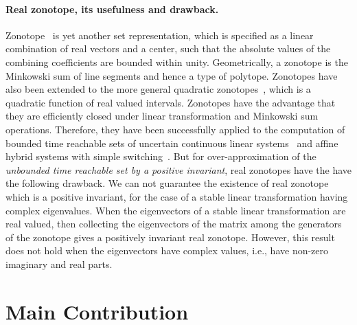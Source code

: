 \documentclass[11pt,a4paper,twoside,openright]{article}
\begin{document}
\paragraph{Real zonotope, its usefulness and drawback.}
Zonotope~\cite{DBLP:conf/hybrid/Girard05} is yet another set
representation, which is specified as a linear combination of real
vectors and a center, such that the absolute values of the combining
coefficients are bounded within unity.  Geometrically, a zonotope is
the Minkowski sum of line segments and hence a type of polytope.
Zonotopes have also been extended to the more general quadratic
zonotopes~\cite{DBLP:conf/aplas/AdjeGW15}, which is a quadratic
function of real valued intervals.  Zonotopes have the advantage that
they are efficiently closed under linear transformation and Minkowski
sum operations.  Therefore, they have been successfully applied to the
computation of bounded time reachable sets of uncertain continuous
linear systems~\cite{DBLP:conf/hybrid/Girard05} and affine hybrid
systems with simple
switching~\cite{makhlouf2014networked,girard2008zonotope}.  But for
over-approximation of the {\it unbounded time reachable set by a
  positive invariant}, real zonotopes have the have the following
drawback.  We can not guarantee the existence of real zonotope which
is a positive invariant, for the case of a stable linear transformation
having complex eigenvalues.  When the eigenvectors of a stable linear
transformation are real valued, then collecting the eigenvectors of
the matrix among the generators of the zonotope gives a positively
invariant real zonotope.  However, this result does not hold when the
eigenvectors have complex values, i.e., have non-zero imaginary and
real parts.



\section {Main Contribution}
\end{document}
